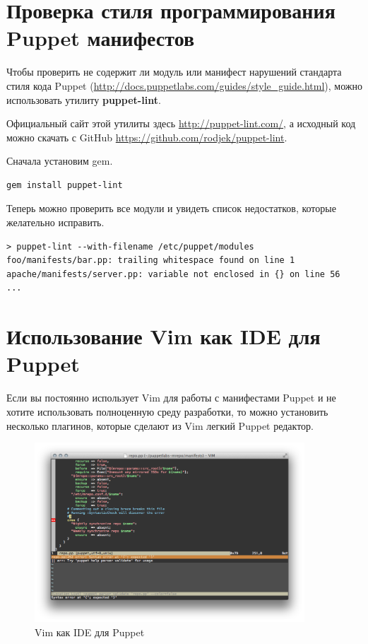 \section{Проверка стиля программирования Puppet манифестов}

Чтобы проверить не содержит ли модуль или манифест нарушений стандарта стиля кода Puppet (\url{http://docs.puppetlabs.com/guides/style_guide.html}), можно использовать утилиту \textbf{puppet-lint}.

Официальный сайт этой утилиты здесь \url{http://puppet-lint.com/}, а исходный код можно скачать с GitHub \url{https://github.com/rodjek/puppet-lint}.

Сначала установим gem.

\begin{verbatim}
gem install puppet-lint
\end{verbatim}

Теперь можно проверить все модули и увидеть список недостатков, которые желательно исправить.

\begin{verbatim}
> puppet-lint --with-filename /etc/puppet/modules
foo/manifests/bar.pp: trailing whitespace found on line 1
apache/manifests/server.pp: variable not enclosed in {} on line 56
...
\end{verbatim}

\section{Использование Vim как IDE для Puppet}

Если вы постоянно использует Vim для работы с манифестами Puppet и не хотите использовать полноценную среду разработки, то можно установить несколько плагинов, которые сделают из Vim легкий Puppet редактор.

\begin{figure}[h]
\centering
\includegraphics[width=0.9\textwidth]{img/syntastic.png}
\caption{Vim как IDE для Puppet}
\label{fig:syntastic}
\end{figure}

